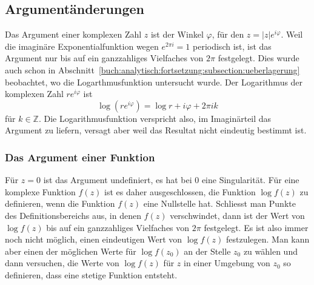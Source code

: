 %
%
%
\subsection{Argumentänderungen}
Das Argument einer komplexen Zahl $z$ ist der Winkel $\varphi$, für den
$z=|z|e^{i\varphi}$.
Weil die imaginäre Exponentialfunktion wegen $e^{2\pi i}=1$ periodisch
ist, ist das Argument nur bis auf ein ganzzahliges Vielfaches von $2\pi$
festgelegt.
Dies wurde auch schon in
Abschnitt~\ref{buch:analytisch:fortsetzung:subsection:ueberlagerung}
beobachtet, wo die Logarthmusfunktion untersucht wurde.
Der Logarithmus der komplexen Zahl $re^{i\varphi}$ ist
\[
\log (re^{i\varphi}) = \log r + i\varphi + 2\pi i k
\]
für $k\in\mathbb{Z}$.
Die Logarithmusfunktion verspricht also, im Imaginärteil das
Argument zu liefern, versagt aber weil das Resultat nicht eindeutig
bestimmt ist.

%
%
\subsubsection{Das Argument einer Funktion}
Für $z=0$ ist das Argument undefiniert, es hat bei $0$ eine
Singularität.
Für eine komplexe Funktion $f(z)$ ist es daher ausgeschlossen,
die Funktion $\log f(z)$ zu definieren, wenn die Funktion $f(z)$
eine Nullstelle hat.
Schliesst man Punkte des Definitionsbereichs aus, in denen $f(z)$
verschwindet, dann ist der Wert von $\log f(z)$ bis auf ein ganzzahliges
Vielfaches von $2\pi$ festgelegt.
Es ist also immer noch nicht möglich, einen eindeutigen Wert von $\log f(z)$
festzulegen.
Man kann aber einen der möglichen Werte für $\log f(z_0)$ an der Stelle
$z_0$ zu wählen und dann versuchen, die Werte von $\log f(z)$ für $z$ 
in einer Umgebung von $z_0$ so definieren, dass eine stetige
Funktion entsteht.

